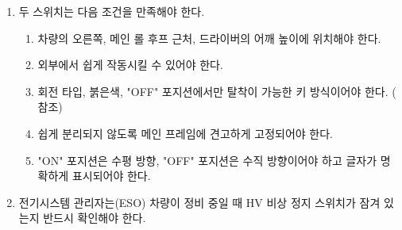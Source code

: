 \documentclass[final,a4paper,10pt]{report}
\begin{document}
\begin{enumerate}
  \item\label{rule:formula-technical.master-switch.shared-switch-conditions} 두 스위치는 다음 조건을 만족해야 한다.
    \begin{enumerate}
      \item\label{rule:formula-technical.master-switch.shared-switch-conditions.right-side-shoulder-height} 차량의 오른쪽, 메인 롤 후프 근처, 드라이버의 어깨 높이에 위치해야 한다.
      \item\label{rule:formula-technical.master-switch.shared-switch-conditions.easily-operable-from-outside} 외부에서 쉽게 작동시킬 수 있어야 한다.
      \item\label{rule:formula-technical.master-switch.shared-switch-conditions.rotary-key-off-removal} 회전 타입, 붉은색, "OFF" 포지션에서만 탈착이 가능한 키 방식이어야 한다. ( 참조)
      \item\label{rule:formula-technical.master-switch.shared-switch-conditions.securely-mounted-to-frame} 쉽게 분리되지 않도록 메인 프레임에 견고하게 고정되어야 한다.
      \item\label{rule:formula-technical.master-switch.shared-switch-conditions.on-off-orientation-labeled} "ON" 포지션은 수평 방향, "OFF" 포지션은 수직 방향이어야 하고 글자가 명확하게 표시되어야 한다.
    \end{enumerate}

  \item\label{rule:formula-technical.master-switch.eso-lock-verification} 전기시스템 관리자는(ESO) 차량이 정비 중일 때 HV 비상 정지 스위치가 잠겨 있는지 반드시 확인해야 한다.
\end{enumerate}
\end{document}
